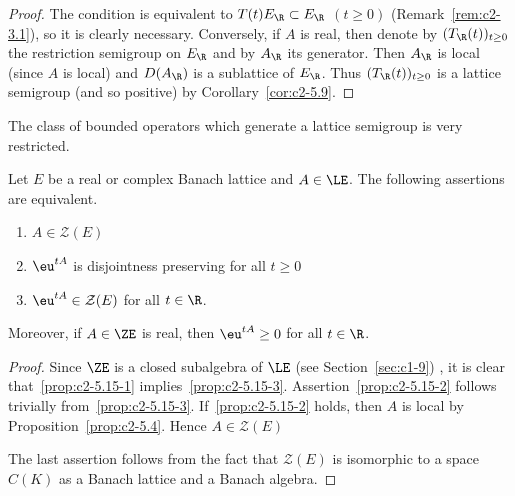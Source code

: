 \begin{proof}
The condition is equivalent to $T(t)E_{\R} \subset E_{\R}$ $(t \geq 0)$ (\cf Remark~\ref{rem:c2-3.1}), so it is clearly necessary.
Conversely, if\/ $A$ is real, then denote by $(T_{\R}(t))_{t \geq 0}$ the restriction semigroup on $E_{\R}$ and by $A_{\R}$ its generator.
Then $A_{\R}$ is local (since $A$ is local) and $D(A_{\R})$ is a sublattice of\/ $E_{\R}$.
Thus $(T_{\R}(t))_{t \geq 0}$ is a lattice semigroup (and so positive) by Corollary~\ref{cor:c2-5.9}.
\end{proof}

The class of bounded operators which generate a lattice semigroup is very restricted.

\begin{proposition}\label{prop:c2-5.15}
%
Let $E$ be a real or complex Banach lattice and $A \in \LE$. 
The following assertions are equivalent.
\begin{enumerate}[\upshape (a)]
\item \label{prop:c2-5.15-1}
$A \in \mathcal{Z}(E)$
\item \label{prop:c2-5.15-2}
$\eu^{tA}$ is disjointness preserving for all $t \geq 0$
\item \label{prop:c2-5.15-3}
$\eu^{tA} \in \mathcal{Z}(E)$ for all $t \in \R$.
\end{enumerate}
Moreover, if\/ $A \in \ZE$ is real, then $\eu^{tA} \geq 0$ for all $t \in \R$.
\end{proposition}

\begin{proof}
Since $\ZE$ is a closed subalgebra of\/ $\LE$ (see Section~\ref{sec:c1-9})
, it is clear that~\ref{prop:c2-5.15-1}   implies~\ref{prop:c2-5.15-3}.
Assertion~\ref{prop:c2-5.15-2}  follows trivially from~\ref{prop:c2-5.15-3}.
If~\ref{prop:c2-5.15-2}   holds, then $A$ is local by  Proposition~\ref{prop:c2-5.4}.
Hence $A \in \mathcal{Z}(E)$

The last assertion follows from the fact that $\mathcal{Z}(E)$ is isomorphic to a space $C(K)$ as a Banach lattice and a Banach algebra.
\end{proof}

